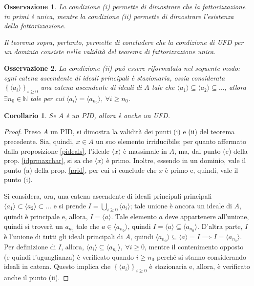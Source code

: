 \documentclass[11pt]{article}
\theoremstyle{style}
\newtheorem{corollario}{Corollario}[teorema]
\newtheorem{osservazione}{Osservazione}[section]
\numberwithin{equation}{subsection}
\begin{document}
\begin{osservazione}
La condizione (i) permette di dimostrare che la fattorizzazione in primi \`e unica, mentre la condizione (ii) permette di dimostrare l'esistenza della fattorizzazione.

Il teorema sopra, pertanto, permette di concludere che la condizione di UFD per un dominio consiste nella validit\`a del teorema di fattorizzazione unica.
\end{osservazione}
\begin{osservazione}
La condizione (ii) pu\`o essere riformulata nel seguente modo: ogni catena ascendente di ideali principali \`e stazionaria, ossia considerata $\left\{ \langle a_i \rangle \right\} _{i\ge 0} $ una catena ascendente di ideali di $A$ tale che $\langle a_1 \rangle\subseteq \langle a_2 \rangle\subseteq \ldots$, allora $\exists n_0 \in \mathbb{N}$ tale per cui $\langle a_i \rangle= \langle a_{n_0}  \rangle, \ \forall i\ge n_0$.
\end{osservazione}
\begin{corollario}
	Se $A$ \`e un PID, allora \`e anche un UFD.
\end{corollario}
	\begin{proof}
		Preso $A$ un PID, si dimostra la validit\`a dei punti (i) e (ii) del teorema precedente.
		Sia, quindi, $x \in A$ un suo elemento irriducibile; per quanto affermato dalla proposizione \ref{pideals}, l'ideale $\langle x \rangle$ \`e massimale in $A$, ma, dal punto (e) della prop. \ref{idprmaxchar}, si sa che $\langle x \rangle$ \`e primo.
		Inoltre, essendo in un dominio, vale il punto (a) della prop. \ref{prid}, per cui si conclude che $x$ \`e primo e, quindi, vale il punto (i).

		Si considera, ora, una catena ascendente di ideali principali principali $\langle a_1 \rangle\subset \langle a_2 \rangle\subset \ldots$ e si prende $I = \bigcup _{i\ge 0} \langle a_i \rangle$; tale unione \`e ancora un ideale di $A$, quindi \`e principale e, allora, $I = \langle a \rangle$.
		Tale elemento $a$ deve appartenere all'unione, quindi si trover\`a un $a_{n_0} $ tale che $a \in \langle a_{n_0}  \rangle$, quindi $I = \langle a \rangle\subseteq \langle a_{n_0}  \rangle$.
		D'altra parte, $I$ \`e l'unione di tutti gli ideali principali di $A$, quindi $\langle a_{n_0}  \rangle\subseteq \langle a \rangle= I \implies I = \langle a_{n_0}  \rangle$.
		Per definizione di $I$, allora, $\langle a_i \rangle\subseteq \langle a_{n_0}  \rangle, \ \forall i\ge 0$, mentre il contenimento opposto (e quindi l'uguaglianza) \`e verificato quando $i\ge n_0$ perch\'e si stanno considerando ideali in catena.
		Questo implica che $\left\{ \langle a_i \rangle \right\} _{i\ge 0} $ \`e stazionaria e, allora, \`e verificato anche il punto (ii).
	\end{proof}
\end{document}
